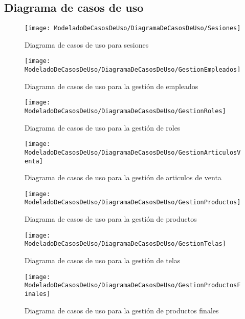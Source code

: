 	\subsection{Diagrama de casos de uso}
	\begin{figure}[H]
		\centering
		\texttt{[image: ModeladoDeCasosDeUso/DiagramaDeCasosDeUso/Sesiones]}
		\caption{Diagrama de casos de uso para sesiones}
	\label{fig:Sesiones}
	\end{figure}
	\begin{figure}[H]
		\centering
		\texttt{[image: ModeladoDeCasosDeUso/DiagramaDeCasosDeUso/GestionEmpleados]}
		\caption{Diagrama de casos de uso para la gestión de empleados}
	\label{fig:GestionEmpleados}
	\end{figure}
	\begin{figure}[H]
		\centering
		\texttt{[image: ModeladoDeCasosDeUso/DiagramaDeCasosDeUso/GestionRoles]}
		\caption{Diagrama de casos de uso para la gestión de roles}
	\label{fig:GestionRoles}
	\end{figure}
	\begin{figure}[H]
		\centering
		\texttt{[image: ModeladoDeCasosDeUso/DiagramaDeCasosDeUso/GestionArticulosVenta]}
		\caption{Diagrama de casos de uso para la gestión de articulos de venta}
	\label{fig:GestionArticulosVenta}
	\end{figure}
    \begin{figure}[H]
		\centering
		\texttt{[image: ModeladoDeCasosDeUso/DiagramaDeCasosDeUso/GestionProductos]}
		\caption{Diagrama de casos de uso para la gestión de productos}
	\label{fig:GestionProductos}
    \end{figure}
    \begin{figure}[H]
		\centering
		\texttt{[image: ModeladoDeCasosDeUso/DiagramaDeCasosDeUso/GestionTelas]}
		\caption{Diagrama de casos de uso para la gestión de telas}
	\label{fig:GestionTelas}
    \end{figure}
    \begin{figure}[H]
		\centering
		\texttt{[image: ModeladoDeCasosDeUso/DiagramaDeCasosDeUso/GestionProductosFinales]}
		\caption{Diagrama de casos de uso para la gestión de productos finales}
	\label{fig:GestionProductosFinales}
    \end{figure}
